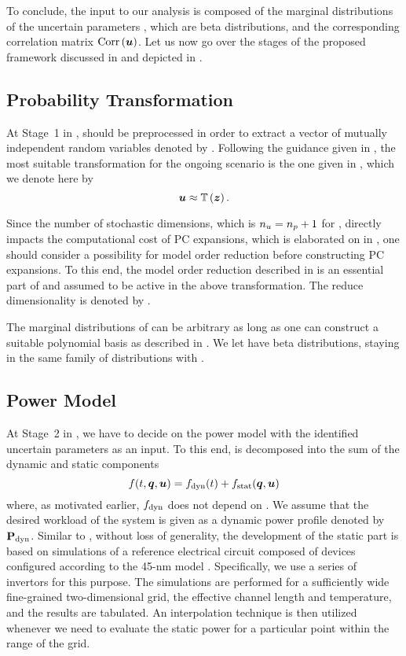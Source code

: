 To conclude, the input to our analysis is composed of the marginal distributions
of the uncertain parameters \vu, which are beta distributions, and the
corresponding correlation matrix $\correlation{\vu}$. Let us now go over the
stages of the proposed framework discussed in  and depicted
in .

\subsection{Probability Transformation}

At Stage~1 in , \vu should be preprocessed in order to
extract a vector of mutually independent random variables denoted by \vz.
Following the guidance given in , the
most suitable transformation for the ongoing scenario is the one given in
, which we denote here by
\[
  \vu \approx \transform{\vz}.
\]

Since the number of stochastic dimensions, which is ${n_{u}} = {n_{p}} + 1$ for \vu,
directly impacts the computational cost of \ac{PC} expansions, which is
elaborated on in , one should consider a possibility
for model order reduction before constructing \ac{PC} expansions. To this end,
the model order reduction described in  is an
essential part of and assumed to be active in the above transformation. The
reduce dimensionality is denoted by \nz.

The marginal distributions of \vz can be arbitrary as long as one can construct
a suitable polynomial basis as described in . We let
\vz have beta distributions, staying in the same family of distributions with
\vu.

\subsection{Power Model}

At Stage~2 in , we have to decide on the power model with
the identified uncertain parameters as an input. To this end,
 is decomposed into the sum of the dynamic and static
components
\[
  f(t, \boldsymbol{q}, \boldsymbol{u}) = f_{\mathrm{dyn}}(t) + f_{\mathrm{stat}}(\boldsymbol{q}, \boldsymbol{u})
\]
where, as motivated earlier, $f_{\mathrm{dyn}}$ does not depend on \vu. We assume that
the desired workload of the system is given as a dynamic power profile denoted
by $\mathbf{P}_{\mathrm{dyn}}$. Similar to , without loss of
generality, the development of the static part is based on 
simulations of a reference electrical circuit composed of  devices
\cite{bsim} configured according to the 45-nm  model \cite{ptm}.
Specifically, we use a series of  invertors for this purpose. The
simulations are performed for a sufficiently wide fine-grained two-dimensional
grid, the effective channel length and temperature, and the results are
tabulated. An interpolation technique is then utilized whenever we need to
evaluate the static power for a particular point within the range of the grid.

